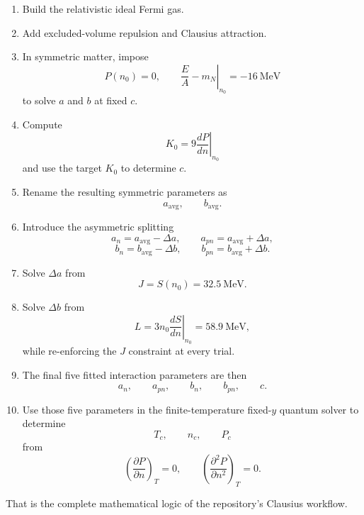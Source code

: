 \documentclass[11pt]{article}
\begin{document}
\begin{enumerate}
\item Build the relativistic ideal Fermi gas.
\item Add excluded-volume repulsion and Clausius attraction.
\item In symmetric matter, impose
\[
P(n_0)=0,\qquad
\left.\frac{E}{A}-m_N\right|_{n_0}=-16\ \mathrm{MeV}
\]
to solve $a$ and $b$ at fixed $c$.
\item Compute
\[
K_0=9\left.\frac{dP}{dn}\right|_{n_0}
\]
and use the target $K_0$ to determine $c$.
\item Rename the resulting symmetric parameters as
\[
a_{\mathrm{avg}},\qquad b_{\mathrm{avg}}.
\]
\item Introduce the asymmetric splitting
\[
a_n=a_{\mathrm{avg}}-\Delta a,\qquad
a_{pn}=a_{\mathrm{avg}}+\Delta a,
\]
\[
b_n=b_{\mathrm{avg}}-\Delta b,\qquad
b_{pn}=b_{\mathrm{avg}}+\Delta b.
\]
\item Solve $\Delta a$ from
\[
J=S(n_0)=32.5\ \mathrm{MeV}.
\]
\item Solve $\Delta b$ from
\[
L=3n_0\left.\frac{dS}{dn}\right|_{n_0}=58.9\ \mathrm{MeV},
\]
while re-enforcing the $J$ constraint at every trial.
\item The final five fitted interaction parameters are then
\[
a_n,\qquad a_{pn},\qquad b_n,\qquad b_{pn},\qquad c.
\]
\item Use those five parameters in the finite-temperature fixed-$y$ quantum
solver to determine
\[
T_c,\qquad n_c,\qquad P_c
\]
from
\[
\left(\frac{\partial P}{\partial n}\right)_T=0,
\qquad
\left(\frac{\partial^2 P}{\partial n^2}\right)_T=0.
\]
\end{enumerate}

That is the complete mathematical logic of the repository's Clausius workflow.
\end{document}
